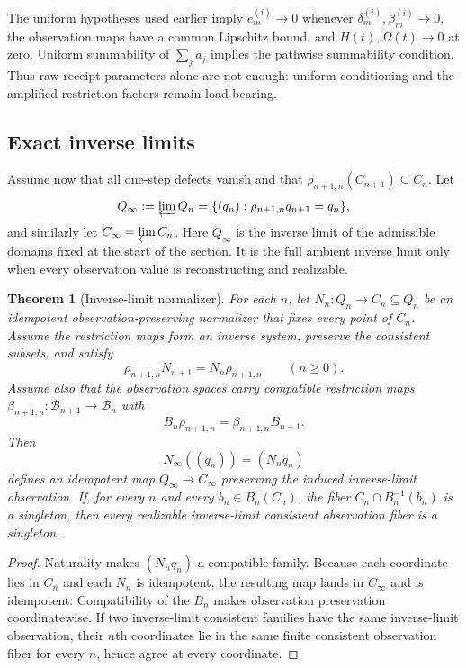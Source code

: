 \documentclass[11pt]{article}
\newtheorem{theorem}{Theorem}[section]
\theoremstyle{definition}
\theoremstyle{remark}
\numberwithin{equation}{section}
\newcommand{\cB}{\mathcal B}
\begin{document}
The uniform hypotheses used earlier imply $e_m^{(i)}\to0$ whenever
$\delta_m^{(i)},\beta_m^{(i)}\to0$, the observation maps have a common
Lipschitz bound, and $H(t),\Omega(t)\to0$ at zero.  Uniform summability of
$\sum_j a_j$ implies the pathwise summability condition.  Thus raw receipt
parameters alone are not enough: uniform conditioning and the amplified
restriction factors remain load-bearing.

\subsection{Exact inverse limits}

Assume now that all one-step defects vanish and that
$\rho_{n+1,n}(C_{n+1})\subseteq C_n$.  Let
\[
 Q_\infty:=\varprojlim Q_n
 =\{(q_n):\rho_{n+1,n}q_{n+1}=q_n\},
\]
and similarly let $C_\infty=\varprojlim C_n$.
Here $Q_\infty$ is the inverse limit of the admissible domains fixed at the
start of the section.  It is the full ambient inverse limit only when every
observation value is reconstructing and realizable.

\begin{theorem}[Inverse-limit normalizer]\label{thm:inverse-limit}
For each $n$, let $N_n:Q_n\to C_n\subseteq Q_n$ be an idempotent
observation-preserving normalizer that fixes every point of $C_n$.  Assume the
restriction maps form an inverse system, preserve the consistent subsets, and
satisfy
\[
 \rho_{n+1,n}N_{n+1}=N_n\rho_{n+1,n}
 \qquad(n\ge0).
\]
Assume also that the observation spaces carry compatible restriction maps
$\beta_{n+1,n}:\cB_{n+1}\to\cB_n$ with
\[
 B_n\rho_{n+1,n}=\beta_{n+1,n}B_{n+1}.
\]
Then
\[
 N_\infty((q_n))=(N_nq_n)
\]
defines an idempotent map $Q_\infty\to C_\infty$ preserving the induced
inverse-limit observation.  If, for every $n$ and every
$b_n\in B_n(C_n)$, the fiber $C_n\cap B_n^{-1}(b_n)$ is a singleton, then
every realizable inverse-limit consistent observation fiber is a singleton.
\end{theorem}

\begin{proof}
Naturality makes $(N_nq_n)$ a compatible family.  Because each coordinate lies in $C_n$ and each $N_n$ is idempotent, the resulting map lands in $C_\infty$ and is idempotent.  Compatibility of the $B_n$ makes observation preservation coordinatewise.  If two inverse-limit consistent families have the same inverse-limit observation, their $n$th coordinates lie in the same finite consistent observation fiber for every $n$, hence agree at every coordinate.
\end{proof}
\end{document}
